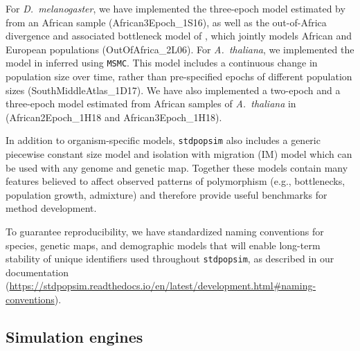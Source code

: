 \documentclass[12pt,halfline,a4paper]{ouparticle}
\newcommand{\stdpopsim}{\texttt{stdpopsim}\xspace}
\newcommand{\MSMC}{\texttt{MSMC}\xspace}
\begin{document}
For \textit{D.~melanogaster}, we have implemented the three-epoch model estimated by \cite{sheehan2016deep} from
an African sample (African3Epoch\_1S16), as well as the out-of-Africa divergence
and associated bottleneck model of \cite{li2006inferring}, which jointly models African
and European populations (OutOfAfrica\_2L06). For \textit{A.~thaliana}, we implemented the
model in \cite{durvasula2017african} inferred using \MSMC. This model includes
a continuous change in population size over time, rather than pre-specified epochs of different
population sizes (SouthMiddleAtlas\_1D17). We have also implemented a two-epoch and a three-epoch model estimated from African
samples of \textit{A.~thaliana} in \cite{huber2018gene} (African2Epoch\_1H18 and African3Epoch\_1H18).

In addition to organism-specific models, \stdpopsim also includes a generic piecewise constant size model and
isolation with migration (IM) model which can be used with any genome and genetic map.
Together these models
contain many features believed to affect observed patterns of polymorphism (e.g., bottlenecks, population growth,
admixture) and therefore provide useful benchmarks for method development.



To guarantee reproducibility,
we have standardized naming
conventions for species, genetic maps, and demographic models that will enable long-term stability
of unique identifiers used throughout \stdpopsim,
as described in our documentation
(\url{https://stdpopsim.readthedocs.io/en/latest/development.html#naming-conventions}).

\subsection*{Simulation engines}
\end{document}
